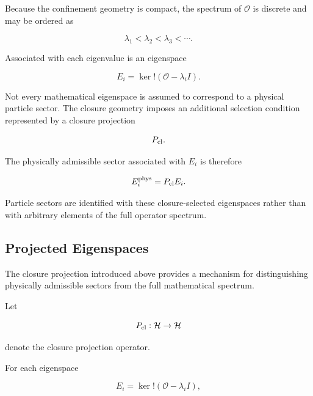\documentclass[11pt]{article}
\theoremstyle{definition}
\theoremstyle{remark}
\begin{document}
Because the confinement geometry is compact, the spectrum of
\(\mathcal O\) is discrete and may be ordered as

\begin{equation}
\lambda_1
<
\lambda_2
<
\lambda_3
<
\cdots.
\end{equation}

Associated with each eigenvalue is an eigenspace

\begin{equation}
E_i = 
\ker
!\left(
\mathcal O-\lambda_i I
\right).
\label{eq:eigenspace_definition}
\end{equation}

Not every mathematical eigenspace is assumed to correspond to a
physical particle sector. The closure geometry imposes an
additional selection condition represented by a closure
projection

\begin{equation}
P_{\rm cl}.
\end{equation}

The physically admissible sector associated with \(E_i\) is
therefore

\begin{equation}
E_i^{\rm phys} =
P_{\rm cl} E_i.
\label{eq:physical_eigenspace}
\end{equation}

Particle sectors are identified with these closure-selected
eigenspaces rather than with arbitrary elements of the full
operator spectrum.


\subsection{Projected Eigenspaces}
\label{subsec:projected_eigenspaces}

The closure projection introduced above provides a mechanism for
distinguishing physically admissible sectors from the full
mathematical spectrum.

Let

\begin{equation}
P_{\rm cl}
:
\mathcal H
\rightarrow
\mathcal H
\end{equation}

denote the closure projection operator.

For each eigenspace

\begin{equation}
E_i = 
\ker
!\left(
\mathcal O-\lambda_i I
\right),
\end{equation}
\end{document}

